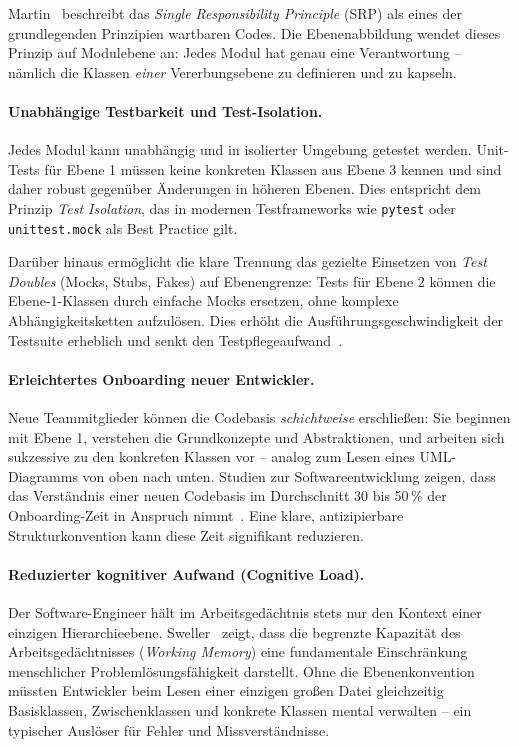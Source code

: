 ﻿\documentclass[a4paper,12pt]{article}
\begin{document}
Martin~\cite{martin2017} beschreibt das \textit{Single Responsibility Principle}
(SRP) als eines der grundlegenden Prinzipien wartbaren Codes. Die Ebenenabbildung
wendet dieses Prinzip auf Modulebene an: Jedes Modul hat genau eine Verantwortung
-- nämlich die Klassen \textit{einer} Vererbungsebene zu definieren und zu
kapseln.

\paragraph{Unabhängige Testbarkeit und Test-Isolation.}
Jedes Modul kann unabhängig und in isolierter Umgebung getestet werden. Unit-Tests
für Ebene 1 müssen keine konkreten Klassen aus Ebene 3 kennen und sind daher
robust gegenüber Änderungen in höheren Ebenen. Dies entspricht dem Prinzip
\textit{Test Isolation}, das in modernen Testframeworks wie \texttt{pytest}
\cite{pytest2024} oder \texttt{unittest.mock} als Best Practice gilt.

Darüber hinaus ermöglicht die klare Trennung das gezielte Einsetzen von
\textit{Test Doubles} (Mocks, Stubs, Fakes) auf Ebenengrenze: Tests für Ebene 2
können die Ebene-1-Klassen durch einfache Mocks ersetzen, ohne komplexe
Abhängigkeitsketten aufzulösen. Dies erhöht die Ausführungsgeschwindigkeit der
Testsuite erheblich und senkt den Testpflegeaufwand~\cite{meszaros2007}.

\paragraph{Erleichtertes Onboarding neuer Entwickler.}
Neue Teammitglieder können die Codebasis \textit{schichtweise} erschließen: Sie
beginnen mit Ebene 1, verstehen die Grundkonzepte und Abstraktionen, und arbeiten
sich sukzessive zu den konkreten Klassen vor -- analog zum Lesen eines
UML-Diagramms von oben nach unten. Studien zur Softwareentwicklung zeigen, dass
das Verständnis einer neuen Codebasis im Durchschnitt 30 bis 50\,\% der
Onboarding-Zeit in Anspruch nimmt~\cite{robillard2011}. Eine klare, antizipierbare
Strukturkonvention kann diese Zeit signifikant reduzieren.

\paragraph{Reduzierter kognitiver Aufwand (Cognitive Load).}
Der Software-Engineer hält im Arbeitsgedächtnis stets nur den Kontext einer
einzigen Hierarchieebene. Sweller~\cite{sweller1988} zeigt, dass die begrenzte
Kapazität des Arbeitsgedächtnisses (\textit{Working Memory}) eine fundamentale
Einschränkung menschlicher Problemlösungsfähigkeit darstellt. Ohne die
Ebenenkonvention müssten Entwickler beim Lesen einer einzigen großen Datei
gleichzeitig Basisklassen, Zwischenklassen und konkrete Klassen mental verwalten
-- ein typischer Auslöser für Fehler und Missverständnisse.
\end{document}
